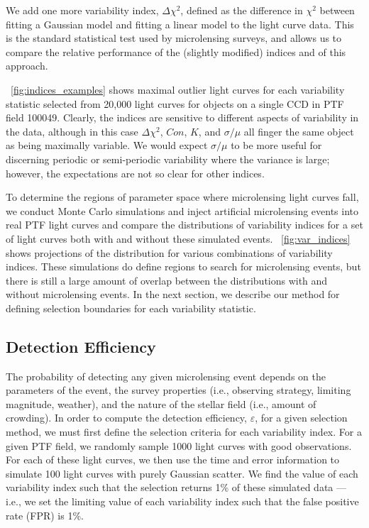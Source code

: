 \documentclass[iop]{emulateapj}
\newcommand{\apwsim}{\raisebox{0.2ex}{\scriptsize$\sim$\normalsize}}
\begin{document}
We add one more variability index, $\Delta \chi^2$, defined as the difference in $\chi^2$ between fitting a Gaussian model and fitting a linear model to the light curve data. This is the standard statistical test used by microlensing surveys, and allows us to compare the relative performance of the (slightly modified) \cite{shin2009} indices and of this approach. 

\figurename~\ref{fig:indices_examples} shows maximal outlier light curves for each variability statistic selected from \apwsim20,000 light curves for objects on a single CCD in PTF field 100049. Clearly, the indices are sensitive to different aspects of variability in the data, although in this case $\Delta \chi^2$, $Con$, $K$, and $\sigma/\mu$ all finger the same object as being maximally variable. We would expect $\sigma/\mu$ to be more useful for discerning periodic or semi-periodic variability where the variance is large; however, the expectations are not so clear for other indices. 

To determine the regions of parameter space where microlensing light curves fall, we conduct Monte Carlo simulations and inject artificial microlensing events into real PTF light curves and compare the distributions of variability indices for a set of light curves both with and without these simulated events. \figurename~\ref{fig:var_indices} shows projections of the distribution for various combinations of variability indices. These simulations do define regions to search for microlensing events, but there is still a large amount of overlap between the distributions with and without microlensing events. In the next section, we describe our method for defining selection boundaries for each variability statistic.


\subsection{Detection Efficiency}
The probability of detecting any given microlensing event depends on the parameters of the event, the survey properties (i.e., observing strategy, limiting magnitude, weather), and the nature of the stellar field (i.e., amount of crowding). In order to compute the detection efficiency, $\varepsilon$, for a given selection method, we must first define the selection criteria for each variability index. For a given PTF field, we randomly sample 1000 light curves with good observations\citep[these have no photometric flags; see description of processing pipeline in][]{nick2009}. For each of these light curves, we then use the time and error information to simulate 100 light curves with purely Gaussian scatter. We find the value of each variability index such that the selection returns 1\% of these simulated data --- i.e., we set the limiting value of each variability index such that the false positive rate (FPR) is 1\%.
\end{document}
